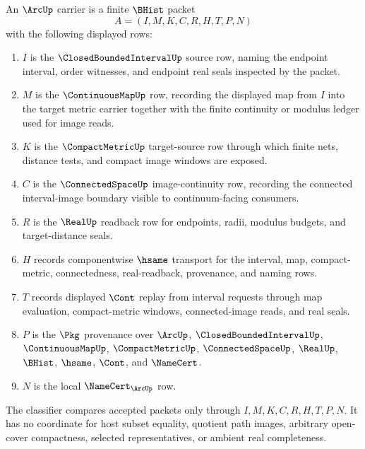 \begin{definition}
\label{def:arc-carrier}
An $\ArcUp$ carrier is a finite $\BHist$ packet
$$
A=(I,M,K,C,R,H,T,P,N)
$$
with the following displayed rows:
\begin{enumerate}
\item $I$ is the $\ClosedBoundedIntervalUp$ source row, naming the endpoint interval, order witnesses, and endpoint real seals inspected by the packet.
\item $M$ is the $\ContinuousMapUp$ row, recording the displayed map from $I$ into the target metric carrier together with the finite continuity or modulus ledger used for image reads.
\item $K$ is the $\CompactMetricUp$ target-source row through which finite nets, distance tests, and compact image windows are exposed.
\item $C$ is the $\ConnectedSpaceUp$ image-continuity row, recording the connected interval-image boundary visible to continuum-facing consumers.
\item $R$ is the $\RealUp$ readback row for endpoints, radii, modulus budgets, and target-distance seals.
\item $H$ records componentwise $\hsame$ transport for the interval, map, compact-metric, connectedness, real-readback, provenance, and naming rows.
\item $T$ records displayed $\Cont$ replay from interval requests through map evaluation, compact-metric windows, connected-image reads, and real seals.
\item $P$ is the $\Pkg$ provenance over $\ArcUp$, $\ClosedBoundedIntervalUp$, $\ContinuousMapUp$, $\CompactMetricUp$, $\ConnectedSpaceUp$, $\RealUp$, $\BHist$, $\hsame$, $\Cont$, and $\NameCert$.
\item $N$ is the local $\NameCert_{\ArcUp}$ row.
\end{enumerate}
The classifier compares accepted packets only through $I,M,K,C,R,H,T,P,N$. It has no coordinate for host subset equality, quotient path images, arbitrary open-cover compactness, selected representatives, or ambient real completeness.
\end{definition}

